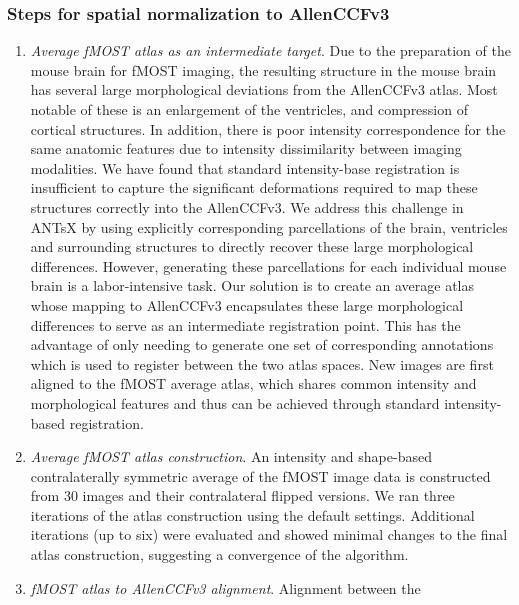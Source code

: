 \documentclass[
  12pt,
]{article}
\begin{document}
\hypertarget{steps-for-spatial-normalization-to-allenccfv3}{%
\subsubsection{Steps for spatial normalization to
AllenCCFv3}\label{steps-for-spatial-normalization-to-allenccfv3}}

\begin{enumerate}
\def\labelenumi{\arabic{enumi}.}
\item
  \emph{Average fMOST atlas as an intermediate target}. Due to the
  preparation of the mouse brain for fMOST imaging, the resulting
  structure in the mouse brain has several large morphological
  deviations from the AllenCCFv3 atlas. Most notable of these is an
  enlargement of the ventricles, and compression of cortical structures.
  In addition, there is poor intensity correspondence for the same
  anatomic features due to intensity dissimilarity between imaging
  modalities. We have found that standard intensity-base registration is
  insufficient to capture the significant deformations required to map
  these structures correctly into the AllenCCFv3. We address this
  challenge in ANTsX by using explicitly corresponding parcellations of
  the brain, ventricles and surrounding structures to directly recover
  these large morphological differences. However, generating these
  parcellations for each individual mouse brain is a labor-intensive
  task. Our solution is to create an average atlas whose mapping to
  AllenCCFv3 encapsulates these large morphological differences to serve
  as an intermediate registration point. This has the advantage of only
  needing to generate one set of corresponding annotations which is used
  to register between the two atlas spaces. New images are first aligned
  to the fMOST average atlas, which shares common intensity and
  morphological features and thus can be achieved through standard
  intensity-based registration.
\item
  \emph{Average fMOST atlas construction}. An intensity and shape-based
  contralaterally symmetric average of the fMOST image data is
  constructed from 30 images and their contralateral flipped versions.
  We ran three iterations of the atlas construction using the default
  settings. Additional iterations (up to six) were evaluated and showed
  minimal changes to the final atlas construction, suggesting a
  convergence of the algorithm.
\item
  \emph{fMOST atlas to AllenCCFv3 alignment}. Alignment between the

\end{enumerate}
\end{document}
